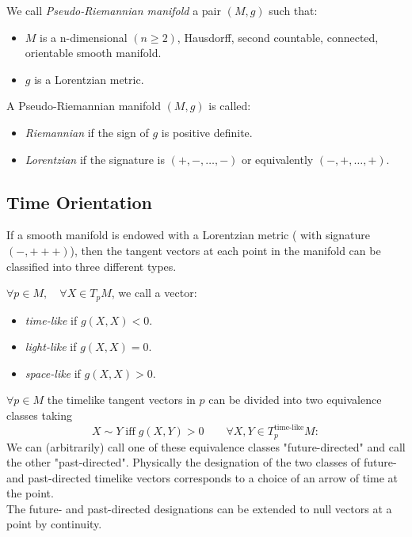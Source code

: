 \documentclass[Main]{subfiles}
\begin{document}
			\begin{definition}
				We call \emph{Pseudo-Riemannian manifold} a pair $(M, g)$ such that:
				\begin{itemize}
					\item $M$ is a n-dimensional $(n\geq2)$, Hausdorff, second countable, connected, orientable smooth manifold.
					\item $g$ is a Lorentzian metric.
				\end{itemize}
			\end{definition}		
				A Pseudo-Riemannian manifold $(M,g)$ is called:
				 \begin{itemize}
				 	\item \emph{Riemannian} if the sign of $g$ is positive definite.%
				 	\item \emph{Lorentzian} if the signature is $(+, -, \ldots,- )$ or equivalently $(-,+,\ldots,+)$.
				 \end{itemize}
		
		\subsection{Time Orientation}
			If a smooth manifold is endowed with a Lorentzian metric ( with signature $(-,+++)$), then the tangent vectors at each point in the manifold can be classified into three different types. 
			\begin{notationfix}

				$\forall p \in M, \quad \forall X \in T_pM$,  we call a vector:
				\begin{itemize}
					\item \emph{time-like} if $g(X,X)<0$.
					\item \emph{light-like} if $g(X,X)=0$.
					\item \emph{space-like} if $g(X,X)>0$.
				\end{itemize}
			\end{notationfix}
		
			\begin{observation}%
			
				$\forall p\in M$ the timelike tangent vectors in $p$ can be divided into two equivalence classes taking
				\begin{displaymath}
					X \sim Y \; \textrm{iff} \; g(X,Y)>0 \qquad \forall X,Y \in T^\textrm{time-like}_pM:
				\end{displaymath}
				We can (arbitrarily) call one of these equivalence classes "future-directed" and call the other "past-directed". Physically the designation of the two classes of future- and past-directed timelike vectors corresponds to a choice of an arrow of time at the point.
				\\
				The future- and past-directed designations can be extended to null vectors at a point by continuity.
			\end{observation}
	
\end{document}
